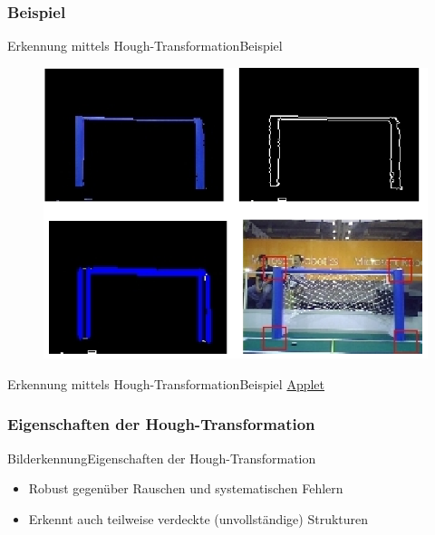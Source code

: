 \documentclass{beamer}
\begin{document}
\subsubsection{Beispiel}
\begin{frame}[label=hough]{Erkennung mittels Hough-Transformation}{Beispiel}
\begin{figure}[htp]
\centering
\includegraphics[scale=0.5]{hough-transformation-method.png}
\end{figure}
\end{frame}

\begin{frame}{Erkennung mittels Hough-Transformation}{Beispiel}
    \href{http://www.activovision.com/octavi/doku.php?id=hough_transform}{Applet}
\end{frame}


\subsubsection{Eigenschaften der Hough-Transformation}
\begin{frame}{Bilderkennung}{Eigenschaften der Hough-Transformation}
\begin{itemize}
    \item Robust gegenüber Rauschen und systematischen Fehlern
    \item Erkennt auch teilweise verdeckte (unvollständige) Strukturen
\end{itemize}
\end{frame}
\end{document}
